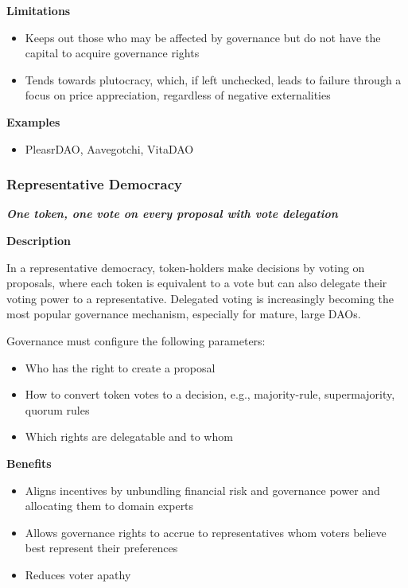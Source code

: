 \documentclass[
]{article}
\providecommand{\tightlist}{%
  \setlength{\itemsep}{0pt}\setlength{\parskip}{0pt}}
\begin{document}
\textbf{Limitations}

\begin{itemize}
\tightlist
\item
  Keeps out those who may be affected by governance but do not have the
  capital to acquire governance rights
\item
  Tends towards plutocracy, which, if left unchecked, leads to failure
  through a focus on price appreciation, regardless of negative
  externalities
\end{itemize}

\textbf{Examples}

\begin{itemize}
\tightlist
\item
  PleasrDAO, Aavegotchi, VitaDAO
\end{itemize}

\hypertarget{representative-democracy}{%
\subsubsection{Representative
Democracy}\label{representative-democracy}}

\textbf{\emph{One token, one vote on every proposal with vote
delegation}}

\textbf{Description}

In a representative democracy, token-holders make decisions by voting on
proposals, where each token is equivalent to a vote but can also
delegate their voting power to a representative. Delegated voting is
increasingly becoming the most popular governance mechanism, especially
for mature, large DAOs.

Governance must configure the following parameters:

\begin{itemize}
\tightlist
\item
  Who has the right to create a proposal
\item
  How to convert token votes to a decision, e.g., majority-rule,
  supermajority, quorum rules
\item
  Which rights are delegatable and to whom
\end{itemize}

\textbf{Benefits}

\begin{itemize}
\tightlist
\item
  Aligns incentives by unbundling financial risk and governance power
  and allocating them to domain experts
\item
  Allows governance rights to accrue to representatives whom voters
  believe best represent their preferences
\item
  Reduces voter apathy
\end{itemize}
\end{document}
